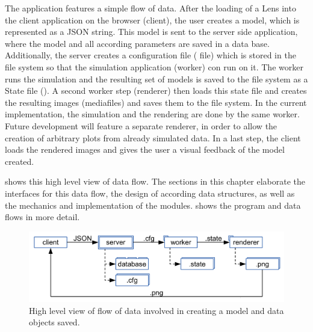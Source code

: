 The application features a simple flow of data.
After the loading of a Lens into the client application on the browser (client), the user creates a model, which is represented as a JSON string.
This model is sent to the server side application, where the model and all according parameters are saved in a data base.
Additionally, the server creates a configuration file ( file) which is stored in the file system so that the simulation application (worker) con run on it.
The worker runs the simulation and the resulting set of models is saved to the file system as a State file ().
A second worker step (renderer) then loads this state file and creates the resulting images (mediafiles) and saves them to the file system.
In the current implementation, the simulation and the rendering are done by the same worker.
Future development will feature a separate renderer, in order to allow the creation of arbitrary plots from already simulated data.
In a last step, the client loads the rendered images and gives the user a visual feedback of the model created.

 shows this high level view of data flow.
The sections in this chapter elaborate the interfaces for this data flow, the design of according data structures, as well as the mechanics and implementation of the modules.
 shows the program and data flows in more detail.

\begin{figure}[htbp]
  \centering
    \includegraphics[width=\figwidth]{fig/dataflow.pdf}
  \caption{High level view of flow of data involved in creating a model and data objects saved.}
  \label{fig:dataflow}
\end{figure}



